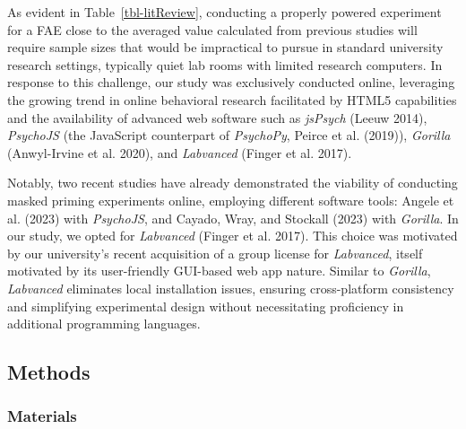 \documentclass[
]{interact}
\begin{document}
As evident in Table~\ref{tbl-litReview}, conducting a properly powered
experiment for a FAE close to the averaged value calculated from
previous studies will require sample sizes that would be impractical to
pursue in standard university research settings, typically quiet lab
rooms with limited research computers. In response to this challenge,
our study was exclusively conducted online, leveraging the growing trend
in online behavioral research facilitated by HTML5 capabilities and the
availability of advanced web software such as \emph{jsPsych} (Leeuw
2014), \emph{PsychoJS} (the JavaScript counterpart of \emph{PsychoPy},
Peirce et al. (2019)), \emph{Gorilla} (Anwyl-Irvine et al. 2020), and
\emph{Labvanced} (Finger et al. 2017).

Notably, two recent studies have already demonstrated the viability of
conducting masked priming experiments online, employing different
software tools: Angele et al. (2023) with \emph{PsychoJS}, and Cayado,
Wray, and Stockall (2023) with \emph{Gorilla}. In our study, we opted
for \emph{Labvanced} (Finger et al. 2017). This choice was motivated by
our university's recent acquisition of a group license for
\emph{Labvanced}, itself motivated by its user-friendly GUI-based web
app nature. Similar to \emph{Gorilla}, \emph{Labvanced} eliminates local
installation issues, ensuring cross-platform consistency and simplifying
experimental design without necessitating proficiency in additional
programming languages.

\subsection{Methods}\label{sec-exp1-methods}

\subsubsection{Materials}\label{sec-exp1-methods-materials}
\end{document}
